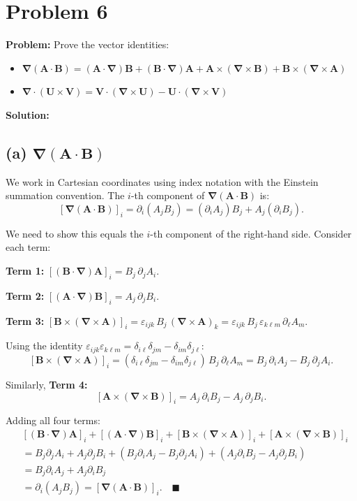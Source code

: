 \documentclass[12pt]{article}
\newcommand{\vect}[1]{\mathbf{#1}}
\newcommand{\grad}{\boldsymbol{\nabla}}
\begin{document}
\section*{Problem 6}

\textbf{Problem:} Prove the vector identities:
\begin{itemize}
\item[(a)] $\grad(\vect{A}\cdot\vect{B}) = (\vect{A}\cdot\grad)\vect{B} + (\vect{B}\cdot\grad)\vect{A} + \vect{A}\times(\grad\times\vect{B}) + \vect{B}\times(\grad\times\vect{A})$
\item[(b)] $\grad\cdot(\vect{U}\times\vect{V}) = \vect{V}\cdot(\grad\times\vect{U}) - \vect{U}\cdot(\grad\times\vect{V})$
\end{itemize}

\bigskip
\textbf{Solution:}

\subsection*{(a) $\grad(\vect{A}\cdot\vect{B})$}

We work in Cartesian coordinates using index notation with the Einstein summation convention. The $i$-th component of $\grad(\vect{A}\cdot\vect{B})$ is:
\[
[\grad(\vect{A}\cdot\vect{B})]_i = \partial_i(A_j B_j) = (\partial_i A_j)B_j + A_j(\partial_i B_j).
\]

We need to show this equals the $i$-th component of the right-hand side. Consider each term:

\textbf{Term 1:} $[(\vect{B}\cdot\grad)\vect{A}]_i = B_j \,\partial_j A_i$.

\textbf{Term 2:} $[(\vect{A}\cdot\grad)\vect{B}]_i = A_j \,\partial_j B_i$.

\textbf{Term 3:} $[\vect{B}\times(\grad\times\vect{A})]_i = \varepsilon_{ijk}\,B_j\,(\grad\times\vect{A})_k = \varepsilon_{ijk}\,B_j\,\varepsilon_{k\ell m}\,\partial_\ell A_m$.

Using the identity $\varepsilon_{ijk}\varepsilon_{k\ell m} = \delta_{i\ell}\delta_{jm} - \delta_{im}\delta_{j\ell}$:
\[
[\vect{B}\times(\grad\times\vect{A})]_i = (\delta_{i\ell}\delta_{jm} - \delta_{im}\delta_{j\ell})\,B_j\,\partial_\ell A_m
= B_j\,\partial_i A_j - B_j\,\partial_j A_i.
\]

Similarly, \textbf{Term 4:}
\[
[\vect{A}\times(\grad\times\vect{B})]_i = A_j\,\partial_i B_j - A_j\,\partial_j B_i.
\]

Adding all four terms:
\begin{align}
&[(\vect{B}\cdot\grad)\vect{A}]_i + [(\vect{A}\cdot\grad)\vect{B}]_i + [\vect{B}\times(\grad\times\vect{A})]_i + [\vect{A}\times(\grad\times\vect{B})]_i \\
&= B_j\partial_j A_i + A_j\partial_j B_i + (B_j\partial_i A_j - B_j\partial_j A_i) + (A_j\partial_i B_j - A_j\partial_j B_i) \\
&= B_j\partial_i A_j + A_j\partial_i B_j \\
&= \partial_i(A_j B_j) = [\grad(\vect{A}\cdot\vect{B})]_i. \quad \blacksquare
\end{align}
\end{document}
